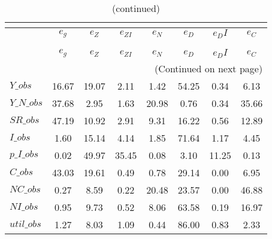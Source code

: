  
\begin{center}
\begin{longtable}{lccccccc} 
\caption{VARIANCE DECOMPOSITION (in percent)}\\
 \label{Table:th_var_decomp_uncond}\\
\toprule 
$           $	 & 	 $       {e_g}$	 & 	 $       {e_Z}$	 & 	 $    {e_{ZI}}$	 & 	 $       {e_N}$	 & 	 $       {e_D}$	 & 	 $      {e_DI}$	 & 	 $       {e_C}$\\
\midrule \endfirsthead 
\caption{(continued)}\\
 \toprule \\ 
$           $	 & 	 $       {e_g}$	 & 	 $       {e_Z}$	 & 	 $    {e_{ZI}}$	 & 	 $       {e_N}$	 & 	 $       {e_D}$	 & 	 $      {e_DI}$	 & 	 $       {e_C}$\\
\midrule \endhead 
\midrule \multicolumn{8}{r}{(Continued on next page)} \\ \bottomrule \endfoot 
\bottomrule \endlastfoot 
$Y\_obs     $	 & 	       16.67	 & 	       19.07	 & 	        2.11	 & 	        1.42	 & 	       54.25	 & 	        0.34	 & 	        6.13 \\ 
$Y\_N\_obs  $	 & 	       37.68	 & 	        2.95	 & 	        1.63	 & 	       20.98	 & 	        0.76	 & 	        0.34	 & 	       35.66 \\ 
$SR\_obs    $	 & 	       47.19	 & 	       10.92	 & 	        2.91	 & 	        9.31	 & 	       16.22	 & 	        0.56	 & 	       12.89 \\ 
$I\_obs     $	 & 	        1.60	 & 	       15.14	 & 	        4.14	 & 	        1.85	 & 	       71.64	 & 	        1.17	 & 	        4.45 \\ 
$p\_I\_obs  $	 & 	        0.02	 & 	       49.97	 & 	       35.45	 & 	        0.08	 & 	        3.10	 & 	       11.25	 & 	        0.13 \\ 
$C\_obs     $	 & 	       43.03	 & 	       19.61	 & 	        0.49	 & 	        0.78	 & 	       29.14	 & 	        0.00	 & 	        6.95 \\ 
$NC\_obs    $	 & 	        0.27	 & 	        8.59	 & 	        0.22	 & 	       20.48	 & 	       23.57	 & 	        0.00	 & 	       46.88 \\ 
$NI\_obs    $	 & 	        0.95	 & 	        9.73	 & 	        0.52	 & 	        8.06	 & 	       63.58	 & 	        0.19	 & 	       16.97 \\ 
$util\_obs  $	 & 	        1.27	 & 	        8.03	 & 	        1.09	 & 	        0.44	 & 	       86.00	 & 	        0.83	 & 	        2.33 \\ 

\end{longtable}
\end{center}
